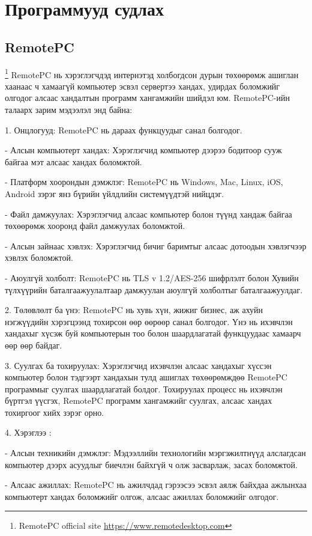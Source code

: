 \section{Программууд судлах}
\subsection{RemotePC}
\footnote{RemotePC official site \url{https://www.remotedesktop.com}}
	\quad \quad RemotePC нь хэрэглэгчдэд интернэтэд холбогдсон дурын төхөөрөмж ашиглан хаанаас ч хамаагүй компьютер эсвэл сервертээ хандах, удирдах боломжийг олгодог алсаас хандалтын программ хангамжийн шийдэл юм. RemotePC-ийн талаарх зарим мэдээлэл энд байна:

1. Онцлогууд: RemotePC нь дараах функцуудыг санал болгодог.

- Алсын компьютерт хандах: Хэрэглэгчид компьютер дээрээ бодитоор сууж байгаа мэт алсаас хандах боломжтой.
 
- Платформ хоорондын дэмжлэг: RemotePC нь Windows, Mac, Linux, iOS, Android зэрэг янз бүрийн үйлдлийн системүүдтэй нийцдэг.

- Файл дамжуулах: Хэрэглэгчид алсаас компьютер болон түүнд хандаж байгаа төхөөрөмж хооронд файл дамжуулах боломжтой.

- Алсын зайнаас хэвлэх: Хэрэглэгчид бичиг баримтыг алсаас дотоодын хэвлэгчээр хэвлэх боломжтой.

- Аюулгүй холболт: RemotePC нь TLS v 1.2/AES-256 шифрлэлт болон Хувийн түлхүүрийн баталгаажуулалтаар дамжуулан аюулгүй холболтыг баталгаажуулдаг.

2. Төлөвлөлт ба үнэ: RemotePC нь хувь хүн, жижиг бизнес, аж ахуйн нэгжүүдийн хэрэгцээнд тохирсон өөр өөрөөр санал болгодог. Үнэ нь ихэвчлэн хандахыг хүсэж буй компьютерын тоо болон шаардлагатай функцуудаас хамаарч өөр өөр байдаг.

3. Суулгах ба тохируулах: Хэрэглэгчид ихэвчлэн алсаас хандахыг хүссэн компьютер болон тэдгээрт хандахын тулд ашиглах төхөөрөмждөө RemotePC программыг суулгах шаардлагатай болдог. Тохируулах процесс нь ихэвчлэн бүртгэл үүсгэх, RemotePC программ хангамжийг суулгах, алсаас хандах тохиргоог хийх зэрэг орно.

4. Хэрэглээ : 

- Алсын техникийн дэмжлэг: Мэдээллийн технологийн мэргэжилтнүүд алслагдсан компьютер дээрх асуудлыг биечлэн байхгүй ч олж засварлаж, засах боломжтой.

- Алсаас ажиллах: RemotePC нь ажилчдад гэрээсээ эсвэл аялж байхдаа ажлынхаа компьютерт хандах боломжийг олгож, алсаас ажиллах боломжийг олгодог.

